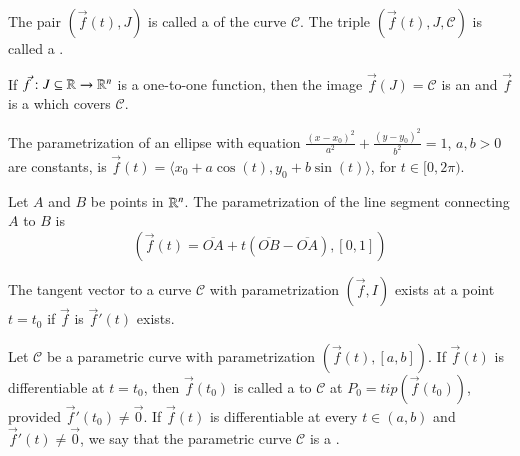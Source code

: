 \documentclass[12pt, a4paper, oneside, openright, titlepage]{book}
\begin{document}
\begin{appendices}
    \begin{rmk}
        The pair $(\vec{f}(t), J)$ is called a  of the curve $\mathscr{C}$. The triple $(\vec{f}(t), J, \mathscr{C})$ is called a .
    \end{rmk}

    \begin{defn}
        If $\vec{f}:J \subseteq \mathbb R\rightarrow \mathbb R^n$ is a one-to-one function, then the image $\vec{f}(J) = \mathscr{C}$ is an  and $\vec{f}$ is a  which covers $\mathscr{C}$.
    \end{defn}

    \begin{rmk}[Ellipse]
        The parametrization of an ellipse with equation $\frac{(x-x_0)^2}{a^2} + \frac{(y-y_0)^2}{b^2} = 1$, $a,b > 0$ are constants, is $\vec{f}(t) = \langle x_0 + a\cos(t), y_0 + b\sin(t)\rangle$, for $t \in [0,2\pi)$.
    \end{rmk}


    \begin{rmk}[Line]
        Let $A$ and $B$ be points in $\mathbb R^n$. The parametrization of the line segment connecting $A$ to $B$ is \begin{equation}
            (\vec{f}(t) = \overline{OA} + t(\overline{OB} - \overline{OA}), [0,1])
        \end{equation}
    \end{rmk}


    \begin{defn}
        The tangent vector to a curve $\mathscr{C}$ with parametrization $(\vec{f}, I)$ exists at a point $t = t_0$ if $\vec{f}$ is $\vec{f}'(t)$ exists.
    \end{defn}


    \begin{defn}
        Let $\mathscr{C}$ be a parametric curve with parametrization $(\vec{f}(t),[a,b])$. If $\vec{f}(t)$ is differentiable at $t = t_0$, then $\vec{f}(t_0)$ is called a  to $\mathscr{C}$ at $P_0 = tip(\vec{f}(t_0))$, provided $\vec{f}'(t_0) \neq \vec{0}$. If $\vec{f}(t)$ is differentiable at every $t \in (a,b)$ and $\vec{f}'(t) \neq \vec{0}$, we say that the parametric curve $\mathscr{C}$ is a .
    \end{defn}
    


\end{appendices}
\end{document}
